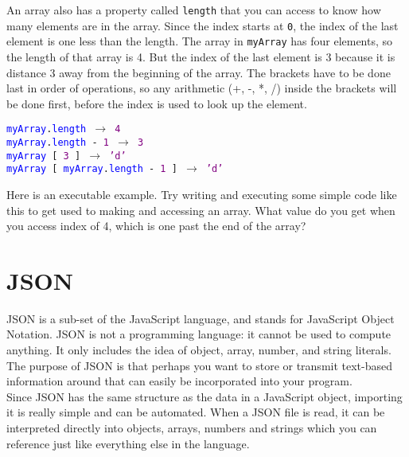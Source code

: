 An array also has a property called \texttt{length} that you can access to know how many elements are in the array. Since the index starts at \texttt{0}, the index of the last element is one less than the length. The array in \texttt{myArray} has four elements, so the length of that array is 4. But the index of the last element is 3 because it is distance 3 away from the beginning of the array. The brackets have to be done last in order of operations, so any arithmetic (+, -, *, /) inside the brackets will be done first, before the index is used to look up the element.

\begin{center}
	\texttt{\textcolor{blue}{myArray}.\textcolor{blue}{length} $\rightarrow$ \textcolor{purple}{4}}\\ \medskip
	\texttt{\textcolor{blue}{myArray}.\textcolor{blue}{length} - \textcolor{purple}{1} $\rightarrow$ \textcolor{purple}{3}}\\ \medskip
	\texttt{\textcolor{blue}{myArray} [ \textcolor{purple}{3} ] $\rightarrow$ \textcolor{purple}{'d'}}\\ \medskip
	\texttt{\textcolor{blue}{myArray} [ \textcolor{blue}{myArray}.\textcolor{blue}{length} - \textcolor{purple}{1} ] $\rightarrow$ \textcolor{purple}{'d'}}
\end{center}

Here is an executable example. Try writing and executing some simple code like this to get used to making and accessing an array. What value do you get when you access index of 4, which is one past the end of the array?


\section{JSON}


JSON is a sub-set of the JavaScript language, and stands for JavaScript Object Notation. JSON is not a programming language: it cannot be used to compute anything. It only includes the idea of object, array, number, and string literals. The purpose of JSON is that perhaps you want to store or transmit text-based information around that can easily be incorporated into your program.\\

Since JSON has the same structure as the data in a JavaScript object, importing it is really simple and can be automated. When a JSON file is read, it can be interpreted directly into objects, arrays, numbers and strings which you can reference just like everything else in the language.
